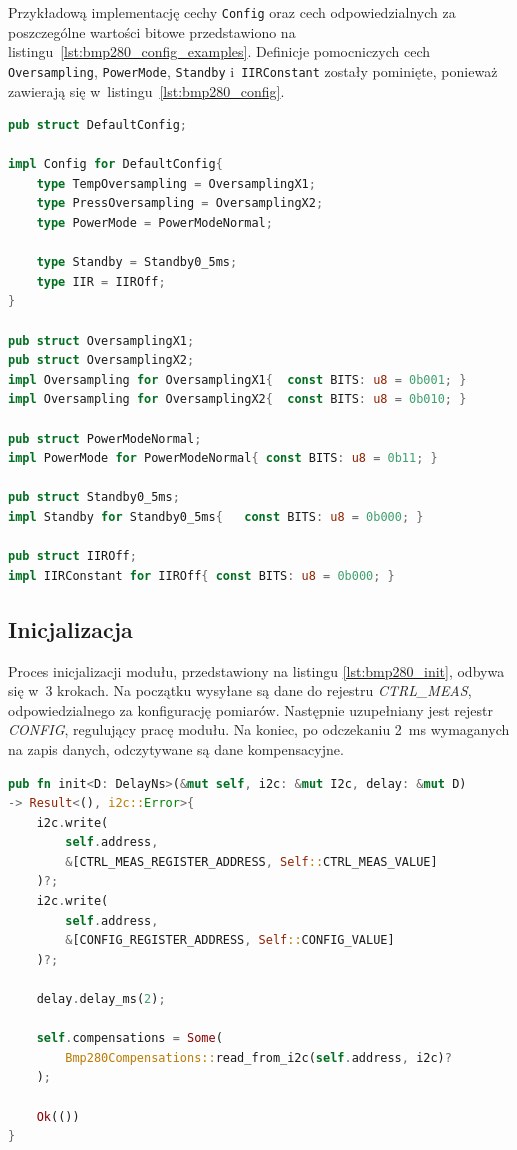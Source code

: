 Przykładową implementację cechy \texttt{Config} oraz cech
odpowiedzialnych za poszczególne wartości bitowe przedstawiono
na listingu~\ref{lst:bmp280_config_examples}. Definicje pomocniczych
cech \texttt{Oversampling}, \texttt{PowerMode}, \texttt{Standby}
i~\texttt{IIRConstant} zostały pominięte, ponieważ zawierają się 
w~listingu~\ref{lst:bmp280_config}.

\begin{lstlisting}[language=Rust, style=colouredRust, 
    caption={Przykładowa implementacja cech konfiguracyjnych modułu BMP280},
    label={lst:bmp280_config_examples}
]
pub struct DefaultConfig;

impl Config for DefaultConfig{
    type TempOversampling = OversamplingX1;
    type PressOversampling = OversamplingX2;
    type PowerMode = PowerModeNormal;

    type Standby = Standby0_5ms;
    type IIR = IIROff;
}

pub struct OversamplingX1;
pub struct OversamplingX2;
impl Oversampling for OversamplingX1{  const BITS: u8 = 0b001; }
impl Oversampling for OversamplingX2{  const BITS: u8 = 0b010; }

pub struct PowerModeNormal;
impl PowerMode for PowerModeNormal{ const BITS: u8 = 0b11; }

pub struct Standby0_5ms;
impl Standby for Standby0_5ms{   const BITS: u8 = 0b000; }

pub struct IIROff;
impl IIRConstant for IIROff{ const BITS: u8 = 0b000; }
\end{lstlisting}

\subsection*{Inicjalizacja}
Proces inicjalizacji modułu, przedstawiony na listingu \ref{lst:bmp280_init}, odbywa się w~3 
krokach.
Na początku wysyłane są dane do rejestru \textit{CTRL\_MEAS}, odpowiedzialnego za
konfigurację pomiarów. 
Następnie uzupełniany jest rejestr \textit{CONFIG}, regulujący pracę modułu.
Na koniec, po odczekaniu \SI{2}{\milli\second} wymaganych na zapis danych, 
odczytywane są dane kompensacyjne.

\begin{lstlisting}[language=Rust, style=colouredRust, 
    caption={Inicjalizacja modułu BMP280},
    label={lst:bmp280_init}
]
pub fn init<D: DelayNs>(&mut self, i2c: &mut I2c, delay: &mut D) 
-> Result<(), i2c::Error>{
    i2c.write(
        self.address, 
        &[CTRL_MEAS_REGISTER_ADDRESS, Self::CTRL_MEAS_VALUE]
    )?;
    i2c.write(
        self.address, 
        &[CONFIG_REGISTER_ADDRESS, Self::CONFIG_VALUE]
    )?;

    delay.delay_ms(2);

    self.compensations = Some(
        Bmp280Compensations::read_from_i2c(self.address, i2c)?
    );

    Ok(())
}
\end{lstlisting}

